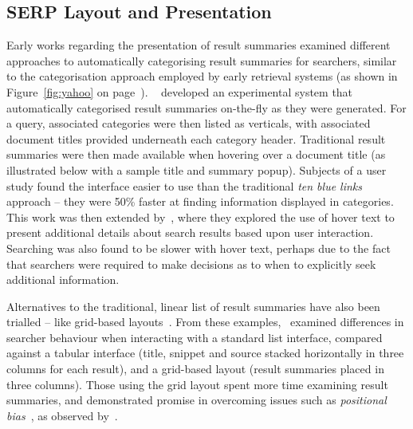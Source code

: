 \subsection{SERP Layout and Presentation}
Early works regarding the presentation of result summaries examined different approaches to automatically categorising result summaries for searchers, similar to the categorisation approach employed by early retrieval systems (as shown in Figure~\ref{fig:yahoo} on page~\pageref{fig:yahoo}). ~\cite{chen2000order_to_web} developed an experimental system that automatically categorised result summaries on-the-fly as they were generated. For a query, associated categories were then listed as verticals, with associated document titles provided underneath each category header. Traditional result summaries were then made available when hovering over a document title (as illustrated below with a sample title and summary popup). Subjects of a user study found the interface easier to use than the traditional \emph{ten blue links} approach -- they were 50\% faster at finding information displayed in categories. This work was then extended by~\cite{dumais2001results_in_context}, where they explored the use of hover text to present additional details about search results based upon user interaction. Searching was also found to be slower with hover text, perhaps due to the fact that searchers were required to make decisions as to when to explicitly seek additional information.

\begin{figure}[h]
    \centering
    \vspace*{-8mm}
\end{figure}

Alternatives to the traditional, linear list of result summaries have also been trialled -- like grid-based layouts~\citep{resnick2001modeling, kammerer2010interface, chierichetti2011two_dimensional_presentation}. From these examples,~\cite{kammerer2010interface} examined differences in searcher behaviour when interacting with a standard list interface, compared against a tabular interface (title, snippet and source stacked horizontally in three columns for each result), and a grid-based layout (result summaries placed in three columns). Those using the grid layout spent more time examining result summaries, and demonstrated promise in overcoming issues such as \emph{positional bias}~\citep{craswell2008click_models}, as observed by~\cite{joachims2005click_model}.

